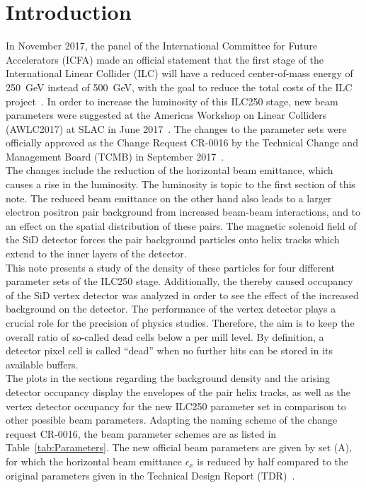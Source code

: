 \documentclass[12pt]{article}
\begin{document}
\section{Introduction}
\label{sec:introduction}
In November 2017, the panel of the International Committee for Future Accelerators (ICFA) made an official statement that the first stage of the International Linear Collider (ILC) will have a  reduced center-of-mass energy of \SI{250}{\GeV} instead of \SI{500}{\GeV}, with the goal to reduce the total costs of the ILC project~\cite{ICFA_Statement}.
In order to increase the luminosity of this ILC250 stage, new beam parameters were suggested at the Americas Workshop on Linear Colliders (AWLC2017) at SLAC in June 2017~\cite{AWLC_Yokoya, AWLC_Jeans}.
The changes to the parameter sets were officially approved as the Change Request CR-0016 by the Technical Change and Management Board (TCMB) in September 2017~\cite{CR-0016}.\\
The changes include the reduction of the horizontal beam emittance, which causes a rise in the luminosity.
The luminosity is topic to the first section of this note.
The reduced beam emittance on the other hand also leads to a larger electron positron pair background from increased beam-beam interactions, and to an effect on the spatial distribution of these pairs.
The magnetic solenoid field of the SiD detector forces the pair background particles onto helix tracks which extend to the inner layers of the detector.\\
This note presents a study of the density of these particles for four different parameter sets of the ILC250 stage.
Additionally, the thereby caused occupancy of the SiD vertex detector was analyzed in order to see the effect of the increased background on the detector.  
The performance of the vertex detector plays a crucial role for the precision of physics studies.
Therefore, the aim is to keep the overall ratio of so-called dead cells below a per mill level.
By definition, a detector pixel cell is called ``dead'' when no further hits can be stored in its available buffers.\\
The plots in the sections regarding the background density and the arising detector occupancy display the envelopes of the pair helix tracks, as well as the vertex detector occupancy for the new ILC250 parameter set in comparison to other possible beam parameters.
Adapting the naming scheme of the change request CR-0016, the beam parameter schemes are as listed in Table~\ref{tab:Parameters}.
The new official beam parameters are given by set (A), for which the horizontal beam emittance  $\epsilon_x$ is reduced by half compared to the original parameters given in the Technical Design Report (TDR)~\cite[p. 11]{TDR1}.
\end{document}
